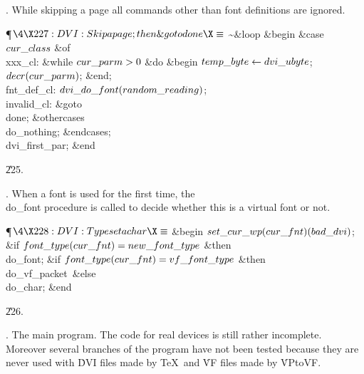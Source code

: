 . While skipping a page all commands other than font definitions are
ignored.

\Y\P$\4\X227:DVI: Skip a page; then \&{goto} \\{done}\X\S$\6
\~ \1\&{loop}\6
\&{begin} \&{case} $\\{cur\_class}$ \1\&{of}\6
\4\\{xxx\_cl}: \&{while} $\\{cur\_parm}>0$ \1\&{do}\6
\&{begin} $\\{temp\_byte}\gets\\{dvi\_ubyte}$;\5
$\\{decr}(\\{cur\_parm})$;\6
\&{end};\2\6
\4\\{fnt\_def\_cl}: $\\{dvi\_do\_font}(\\{random\_reading})$;\6
\4\\{invalid\_cl}: \&{goto} \\{done};\6
\4\&{othercases} \\{do\_nothing};\2\6
\&{endcases};\5
\\{dvi\_first\_par};\6
\&{end}\2\par
\U225.\fi

. When a font is used for the first time, the \\{do\_font} procedure is
called to decide whether this is a virtual font or not.

\Y\P$\4\X228:DVI: Typeset a \\{char}\X\S$\6
\&{begin} $\\{set\_cur\_wp}(\\{cur\_fnt})(\\{bad\_dvi})$;\6
\&{if} $\\{font\_type}(\\{cur\_fnt})=\\{new\_font\_type}$ \1\&{then}\5
\\{do\_font};\2\6
\&{if} $\\{font\_type}(\\{cur\_fnt})=\\{vf\_font\_type}$ \1\&{then}\5
\\{do\_vf\_packet}\ \&{else} \\{do\_char};\2\6
\&{end}\par
\U226.\fi

.  The main program.
The code for real devices is still rather incomplete.
Moreover several branches of the program have not been tested because
they are never used with \.{DVI} files made by \TeX\ and \.{VF} files
made by \.{VPtoVF}.

